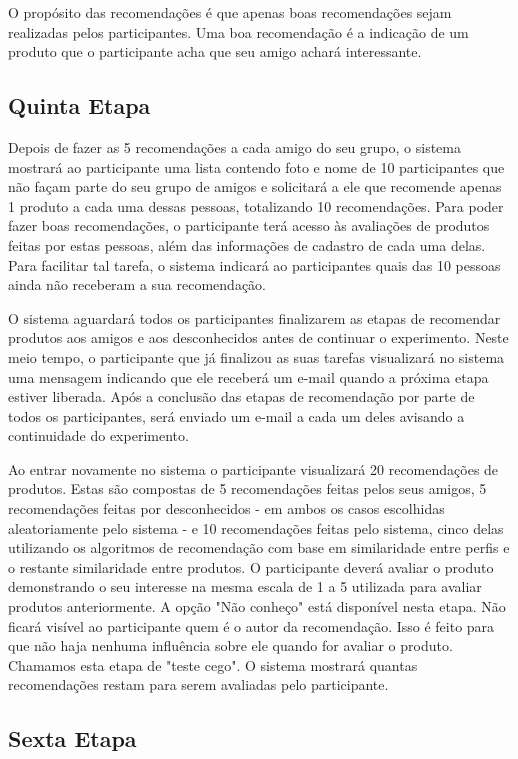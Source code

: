  O propósito das recomendações é que apenas boas recomendações sejam realizadas pelos participantes. Uma boa recomendação é a indicação de um produto que o participante acha que seu amigo achará interessante.

\subsection{Quinta Etapa}

 Depois de fazer as 5 recomendações a cada amigo do seu grupo, o sistema mostrará ao participante uma lista contendo foto e nome de 10 participantes que não façam parte do seu grupo de amigos e solicitará a ele que recomende apenas 1 produto a cada uma dessas pessoas, totalizando 10 recomendações. Para poder fazer boas recomendações, o participante terá acesso às avaliações de produtos feitas por estas pessoas, além das informações de cadastro de cada uma delas. Para facilitar tal tarefa, o sistema indicará ao participantes quais das 10 pessoas ainda não receberam a sua recomendação.

 O sistema aguardará todos os participantes finalizarem as etapas de recomendar produtos aos amigos e aos desconhecidos antes de continuar o experimento. Neste meio tempo, o participante que já finalizou as suas tarefas visualizará no sistema uma mensagem indicando que ele receberá um e-mail quando a próxima etapa estiver liberada. Após a conclusão das etapas de recomendação por parte de todos os participantes, será enviado um e-mail a cada um deles avisando a continuidade do experimento.
 
 Ao entrar novamente no sistema o participante visualizará 20 recomendações de produtos. Estas são compostas de 5 recomendações feitas pelos seus amigos, 5 recomendações feitas por desconhecidos - em ambos os casos escolhidas aleatoriamente pelo sistema - e 10 recomendações feitas pelo sistema, cinco delas utilizando os algoritmos de recomendação com base em similaridade entre perfis e o restante similaridade entre produtos. O participante deverá avaliar o produto demonstrando o seu interesse na mesma escala de 1 a 5 utilizada para avaliar produtos anteriormente. A opção "Não conheço" está disponível nesta etapa. Não ficará visível ao participante quem é o autor da recomendação. Isso é feito para que não haja nenhuma influência sobre ele quando for avaliar o produto. Chamamos esta etapa de "teste cego". O sistema mostrará quantas recomendações restam para serem avaliadas pelo participante.

\subsection{Sexta Etapa}


